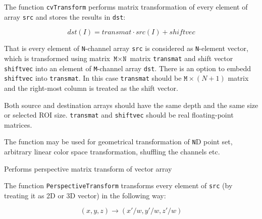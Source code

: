 \begin{description}
\end{description}

The function \texttt{cvTransform} performs matrix transformation of every element of array \texttt{src} and stores the results in \texttt{dst}:

\[
dst(I) = transmat \cdot src(I) + shiftvec %
\]

That is every element of \texttt{N}-channel array \texttt{src} is
considered as \texttt{N}-element vector, which is transformed using
matrix $\texttt{M} \times \texttt{N}$ matrix \texttt{transmat} and shift
vector \texttt{shiftvec} into an element of \texttt{M}-channel array
\texttt{dst}. There is an option to embedd \texttt{shiftvec} into
\texttt{transmat}. In this case \texttt{transmat} should be $\texttt{M}
\times (N+1)$ matrix and the right-most column is treated as the shift
vector.

Both source and destination arrays should have the same depth and the
same size or selected ROI size. \texttt{transmat} and \texttt{shiftvec}
should be real floating-point matrices.

The function may be used for geometrical transformation of \texttt{N}D
point set, arbitrary linear color space transformation, shuffling the
channels etc.

\label{PerspectiveTransform}

Performs perspective matrix transform of vector array


\begin{description}
\end{description}


The function \texttt{PerspectiveTransform} transforms every element of \texttt{src} (by treating it as 2D or 3D vector) in the following way:

\[ (x, y, z) \rightarrow (x'/w, y'/w, z'/w) \]

